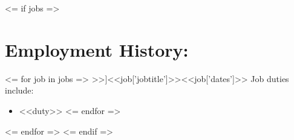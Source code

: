 \documentclass{resume}
\begin{document}
<= if jobs =>
    \section{Employment History:}
    <= for job in jobs =>
        \affiliation[<<job['employername']>>]{<<job['jobtitle']>>}{<<job['dates']>>}\normalsize
        Job duties include:
        \small\begin{itemize}
        <= for duty in job['duties'] =>
            \item <<duty>>
        <= endfor =>
        \end{itemize}\normalsize
        \medskip
    <= endfor =>
<= endif =>
\end{document}

